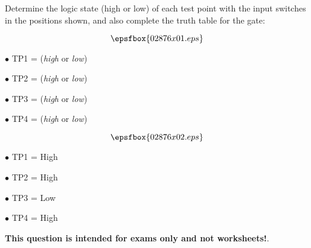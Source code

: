 

Determine the logic state (high or low) of each test point with the input switches in the positions shown, and also complete the truth table for the gate:

$$\epsfbox{02876x01.eps}$$

\medskip
\item{$\bullet$} TP1 = ({\it high} or {\it low}) 
\item{$\bullet$} TP2 = ({\it high} or {\it low}) 
\item{$\bullet$} TP3 = ({\it high} or {\it low}) 
\item{$\bullet$} TP4 = ({\it high} or {\it low}) 
\medskip







$$\epsfbox{02876x02.eps}$$

\medskip
\item{$\bullet$} TP1 = High
\item{$\bullet$} TP2 = High
\item{$\bullet$} TP3 = Low
\item{$\bullet$} TP4 = High
\medskip







{\bf This question is intended for exams only and not worksheets!}.




